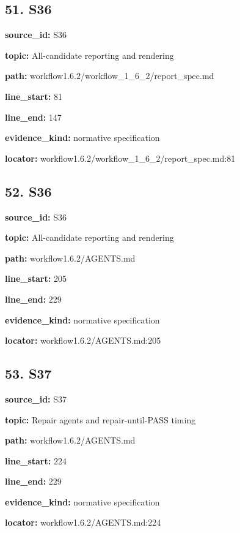 \documentclass[10pt,a4paper]{article}
\begin{document}
\subsection*{51.\allowbreak{} S36}
\textbf{source\_\allowbreak{}id:} S36\par
\textbf{topic:} All-\allowbreak{}candidate reporting and rendering\par
\textbf{path:} workflow1.\allowbreak{}6.\allowbreak{}2/\allowbreak{}workflow\_\allowbreak{}1\_\allowbreak{}6\_\allowbreak{}2/\allowbreak{}report\_\allowbreak{}spec.\allowbreak{}md\par
\textbf{line\_\allowbreak{}start:} 81\par
\textbf{line\_\allowbreak{}end:} 147\par
\textbf{evidence\_\allowbreak{}kind:} normative specification\par
\textbf{locator:} workflow1.\allowbreak{}6.\allowbreak{}2/\allowbreak{}workflow\_\allowbreak{}1\_\allowbreak{}6\_\allowbreak{}2/\allowbreak{}report\_\allowbreak{}spec.\allowbreak{}md:81\par
\subsection*{52.\allowbreak{} S36}
\textbf{source\_\allowbreak{}id:} S36\par
\textbf{topic:} All-\allowbreak{}candidate reporting and rendering\par
\textbf{path:} workflow1.\allowbreak{}6.\allowbreak{}2/\allowbreak{}AGENTS.\allowbreak{}md\par
\textbf{line\_\allowbreak{}start:} 205\par
\textbf{line\_\allowbreak{}end:} 229\par
\textbf{evidence\_\allowbreak{}kind:} normative specification\par
\textbf{locator:} workflow1.\allowbreak{}6.\allowbreak{}2/\allowbreak{}AGENTS.\allowbreak{}md:205\par
\subsection*{53.\allowbreak{} S37}
\textbf{source\_\allowbreak{}id:} S37\par
\textbf{topic:} Repair agents and repair-\allowbreak{}until-\allowbreak{}PASS timing\par
\textbf{path:} workflow1.\allowbreak{}6.\allowbreak{}2/\allowbreak{}AGENTS.\allowbreak{}md\par
\textbf{line\_\allowbreak{}start:} 224\par
\textbf{line\_\allowbreak{}end:} 229\par
\textbf{evidence\_\allowbreak{}kind:} normative specification\par
\textbf{locator:} workflow1.\allowbreak{}6.\allowbreak{}2/\allowbreak{}AGENTS.\allowbreak{}md:224\par
\end{document}
